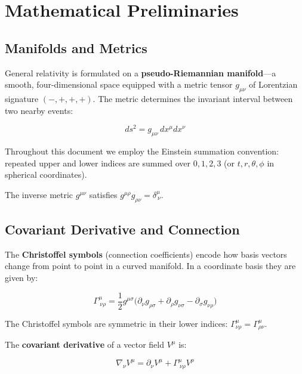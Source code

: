 \documentclass[12pt]{article}
\theoremstyle{definition}
\theoremstyle{remark}
\begin{document}
\section{Mathematical Preliminaries}

\subsection{Manifolds and Metrics}

General relativity is formulated on a \textbf{pseudo-Riemannian manifold}---a smooth, four-dimensional space equipped with a metric tensor $g_{\mu\nu}$ of Lorentzian signature $(-,+,+,+)$. The metric determines the invariant interval between two nearby events:

\begin{equation}
  ds^{2} = g_{\mu\nu}\,dx^{\mu}dx^{\nu}
\end{equation}

Throughout this document we employ the Einstein summation convention: repeated upper and lower indices are summed over $0,1,2,3$ (or $t,r,\theta,\phi$ in spherical coordinates).

The inverse metric $g^{\mu\nu}$ satisfies $g^{\mu\rho}g_{\rho\nu} = \delta^{\mu}_{\ \nu}$.

\subsection{Covariant Derivative and Connection}

The \textbf{Christoffel symbols} (connection coefficients) encode how basis vectors change from point to point in a curved manifold. In a coordinate basis they are given by:

\begin{equation}\label{eq:christoffel}
  \Gamma^{\mu}_{\ \nu\rho} = \frac{1}{2}g^{\mu\sigma}\big(
    \partial_{\nu}g_{\rho\sigma} + \partial_{\rho}g_{\nu\sigma} - \partial_{\sigma}g_{\nu\rho}
  \big)
\end{equation}

The Christoffel symbols are symmetric in their lower indices: $\Gamma^{\mu}_{\nu\rho} = \Gamma^{\mu}_{\rho\nu}$.

The \textbf{covariant derivative} of a vector field $V^{\mu}$ is:

\begin{equation}
  \nabla_{\nu}V^{\mu} = \partial_{\nu}V^{\mu} + \Gamma^{\mu}_{\ \nu\rho}V^{\rho}
\end{equation}
\end{document}
